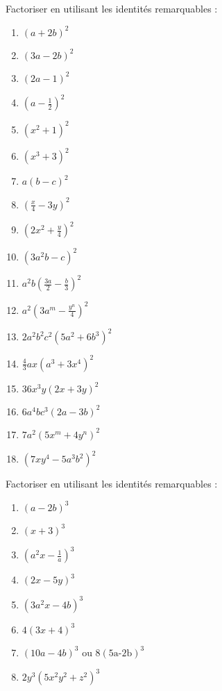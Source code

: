 \begin{solution}
Factoriser en utilisant les identités remarquables : 
\begin{multicols}{2}
\begin{enumerate}
\item ${{(a+2b)}^{2}}$
\item ${{(3a-2b)}^{2}}$
\item ${{(2a-1)}^{2}}$
\item ${{\left( a-\frac{1}{2} \right)}^{2}}$
\item ${{\left( {{x}^{2}}+1 \right)}^{2}}$
\item ${{\left( {{x}^{3}}+3 \right)}^{2}}$
\item $a{{\left( b-c \right)}^{2}}$
\item ${{\left( \frac{x}{4}-3y \right)}^{2}}$
\item ${{\left( 2{{x}^{2}}+\frac{y}{4} \right)}^{2}}$
\item ${{\left( 3{{a}^{2}}b-c \right)}^{2}}$
\item ${{a}^{2}}b{{\left( \frac{3a}{2}-\frac{b}{3} \right)}^{2}}$
\item ${{a}^{2}}{{\left( 3{{a}^{m}}-\frac{{{y}^{n}}}{4} \right)}^{2}}$
\item $2{{a}^{2}}{{b}^{2}}{{c}^{2}}{{\left( 5{{a}^{2}}+6{{b}^{3}} \right)}^{2}}$
\item $\frac{4}{3}ax{{\left( {{a}^{3}}+3{{x}^{4}} \right)}^{2}}$
\item $36{{x}^{3}}y{{\left( 2x+3y \right)}^{2}}$
\item $6{{a}^{4}}b{{c}^{3}}{{\left( 2a-3b \right)}^{2}}$
\item $7{{a}^{2}}{{\left( 5{{x}^{m}}+4{{y}^{n}} \right)}^{2}}$
\item ${{\left( 7x{{y}^{4}}-5{{a}^{3}}{{b}^{2}} \right)}^{2}}$ 
\end{enumerate}
\end{multicols}
\end{solution}

\begin{solution}
Factoriser en utilisant les identités remarquables : 
\begin{multicols}{2}
\begin{enumerate}
\item ${{(a-2b)}^{3}}$
\item ${{\left( x+3 \right)}^{3}}$
\item ${{\left( {{a}^{2}}x-\frac{1}{a} \right)}^{3}}$
\item ${{\left( 2x-5y \right)}^{3}}$
\item ${{\left( 3{{a}^{2}}x-4b \right)}^{3}}$
\item $4{{\left( 3x+4 \right)}^{3}}$
\item ${{\left( 10a-4b \right)}^{3}}\text{ ou 8}{{\left( \text{5a-2b} \right)}^{3}}$
\item $2{{y}^{3}}{{\left( 5{{x}^{2}}{{y}^{2}}+{{z}^{2}} \right)}^{3}}$ 
\end{enumerate}
\end{multicols}
\end{solution}

